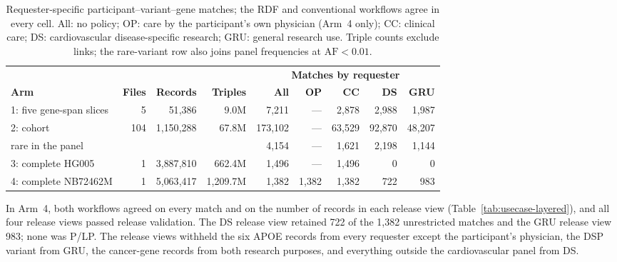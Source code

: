 \documentclass[11pt]{article}
\begin{document}
\begin{table}[!htbp]
\caption{Requester-specific participant--variant--gene matches; the RDF and conventional workflows agree in every cell. All: no policy; OP: care by the participant's own physician (Arm~4 only); CC: clinical care; DS: cardiovascular disease-specific research; GRU: general research use. Triple counts exclude links; the rare-variant row also joins panel frequencies at $\mathrm{AF}<0.01$.}\label{tab:usecase-matches}%
\centering\footnotesize\setlength{\tabcolsep}{6pt}\renewcommand{\arraystretch}{1.1}%
\begin{tabular}{@{}l r r r r r r r r@{}}
\toprule
 & & & & \multicolumn{5}{c}{\textbf{Matches by requester}}\\
\cmidrule(l){5-9}
\textbf{Arm} & \textbf{Files} & \textbf{Records} & \textbf{Triples} & \textbf{All} & \textbf{OP} & \textbf{CC} & \textbf{DS} & \textbf{GRU}\\
\midrule
1: five gene-span slices & 5 & 51{,}386 & 9.0M & 7{,}211 & --- & 2{,}878 & 2{,}988 & 1{,}987\\
2: cohort & 104 & 1{,}150{,}288 & 67.8M & 173{,}102 & --- & 63{,}529 & 92{,}870 & 48{,}207\\
\quad rare in the panel & & & & 4{,}154 & --- & 1{,}621 & 2{,}198 & 1{,}144\\
3: complete HG005 & 1 & 3{,}887{,}810 & 662.4M & 1{,}496 & --- & 1{,}496 & 0 & 0\\
4: complete NB72462M & 1 & 5{,}063{,}417 & 1{,}209.7M & 1{,}382 & 1{,}382 & 1{,}382 & 722 & 983\\
\bottomrule
\end{tabular}
\end{table}

In Arm~4, both workflows agreed on every match and on the number of records in each release view (Table~\ref{tab:usecase-layered}), and all four release views passed release validation.
The DS release view retained 722 of the 1,382 unrestricted matches and the GRU release view 983; none was P/LP.
The release views withheld the six APOE records from every requester except the participant's physician, the DSP variant from GRU, the cancer-gene records from both research purposes, and everything outside the cardiovascular panel from DS.
\end{document}
